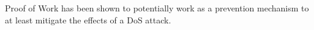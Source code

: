 Proof of Work has been shown to potentially work as a prevention mechanism to at least mitigate the effects of a DoS attack\cite{subpuzzles}.


\begin{comment}
Proof of Work has been shown to potentially work as a prevention mechanism to at least mitigate the effects of a DoS attack without making an as assumption about the source.[källa] However, \citeauthor{LaurieC04} concluded in the paper \citetitle{LaurieC04}, that PoW on it's own, is not a feasible solution to fighting spam and denial of service attacks. This is because the classical implementation of Proof of Work does not seperate legitimate users from attackers. Hence, problems from a Proof of Work protected system would not discourage abusers of the system without having an unacceptable effect on legitimate users. 
\end{comment}
